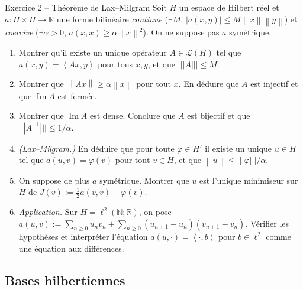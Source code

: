 \documentclass[11pt,a4paper]{article}
\newcommand{\R}{\mathbb{R}}
\newcommand{\N}{\mathbb{N}}
\newcommand{\norm}[1]{\left\|#1\right\|}
\newcommand{\opnorm}[1]{|\!|\!|#1|\!|\!|}
\newcommand{\ps}[2]{\left\langle #1,#2\right\rangle}
\newcommand{\Lc}{\mathcal{L}}
\DeclareMathOperator{\Ima}{Im}
\theoremstyle{definition}
\begin{document}
\begin{exo}{Exercice 2 -- Théorème de Lax--Milgram}
Soit $H$ un espace de Hilbert réel et $a:H\times H\to\R$ une forme bilinéaire \emph{continue} ($\exists M$, $|a(x,y)|\le M\norm x\norm y$) et \emph{coercive} ($\exists\alpha>0$, $a(x,x)\ge\alpha\norm x^2$). On ne suppose pas $a$ symétrique.
\begin{enumerate}[label=(\alph*)]
  \item Montrer qu'il existe un unique opérateur $A\in\Lc(H)$ tel que $a(x,y)=\ps{Ax}y$ pour tous $x,y$, et que $\opnorm A\le M$.
  \item Montrer que $\norm{Ax}\ge\alpha\norm x$ pour tout $x$. En déduire que $A$ est injectif et que $\Ima A$ est fermée.
  \item Montrer que $\Ima A$ est dense. Conclure que $A$ est bijectif et que $\opnorm{A^{-1}}\le1/\alpha$.
  \item \emph{(Lax--Milgram.)} En déduire que pour toute $\varphi\in H'$ il existe un unique $u\in H$ tel que $a(u,v)=\varphi(v)$ pour tout $v\in H$, et que $\norm u\le\opnorm\varphi/\alpha$.
  \item On suppose de plus $a$ symétrique. Montrer que $u$ est l'unique minimiseur sur $H$ de $J(v):=\frac12a(v,v)-\varphi(v)$.
  \item \emph{Application.} Sur $H=\ell^2(\N;\R)$, on pose $a(u,v):=\sum_{n\ge0}u_nv_n+\sum_{n\ge0}(u_{n+1}-u_n)(v_{n+1}-v_n)$. Vérifier les hypothèses et interpréter l'équation $a(u,\cdot)=\ps\cdot b$ pour $b\in\ell^2$ comme une équation aux différences.
\end{enumerate}
\end{exo}

\subsection*{Bases hilbertiennes}
\end{document}
